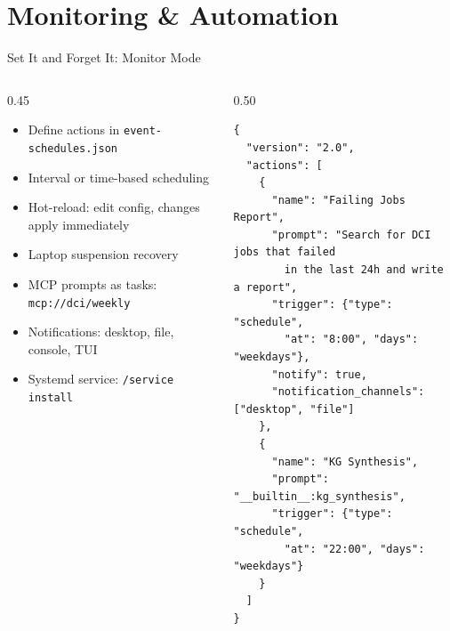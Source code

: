 \documentclass[aspectratio=169,10pt]{beamer}
\begin{document}
\section{Monitoring \& Automation}

\begin{frame}[fragile]{Set It and Forget It: Monitor Mode}
\begin{columns}[T]
\begin{column}{0.45\textwidth}
\begin{itemize}\scriptsize\setlength{\itemsep}{1pt}
  \item Define actions in \texttt{event-schedules.json}
  \item Interval or time-based scheduling
  \item \alert{Hot-reload}: edit config, changes apply immediately
  \item Laptop suspension recovery
  \item MCP prompts as tasks: \texttt{mcp://dci/weekly}
  \item Notifications: desktop, file, console, TUI
  \item \alert{Systemd service}: \texttt{/service install}
\end{itemize}
\end{column}
\begin{column}{0.50\textwidth}
\begin{lstlisting}[style=json,basicstyle=\ttfamily\fontsize{5}{6}\selectfont,title={\scriptsize event-schedules.json}]
{
  "version": "2.0",
  "actions": [
    {
      "name": "Failing Jobs Report",
      "prompt": "Search for DCI jobs that failed
        in the last 24h and write a report",
      "trigger": {"type": "schedule",
        "at": "8:00", "days": "weekdays"},
      "notify": true,
      "notification_channels": ["desktop", "file"]
    },
    {
      "name": "KG Synthesis",
      "prompt": "__builtin__:kg_synthesis",
      "trigger": {"type": "schedule",
        "at": "22:00", "days": "weekdays"}
    }
  ]
}
\end{lstlisting}
\end{column}
\end{columns}
\end{frame}
\end{document}
